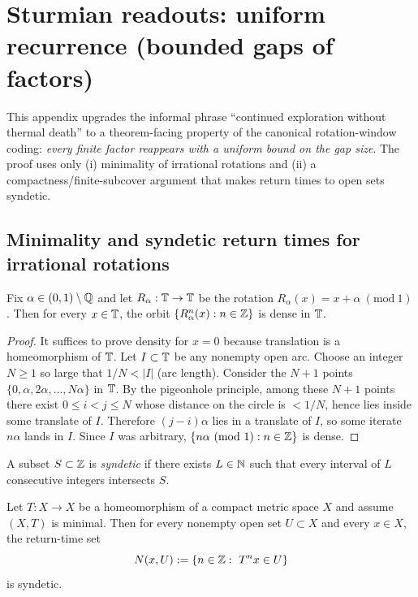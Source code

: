 \section{Sturmian readouts: uniform recurrence (bounded gaps of factors)}
\label{app:sturmian_uniform_recurrence}
\noindent
This appendix upgrades the informal phrase ``continued exploration without thermal death'' to a theorem-facing property of the canonical rotation-window coding:
\emph{every finite factor reappears with a uniform bound on the gap size}.
The proof uses only (i) minimality of irrational rotations and (ii) a compactness/finite-subcover argument that makes return times to open sets syndetic.

\subsection{Minimality and syndetic return times for irrational rotations}
\label{subsec:sturmian_syndetic_rotation}

\begin{lemma}\label{lem:irrational_rotation_minimal}
\MathTag Fix $\alpha\in(0,1)\setminus\mathbb{Q}$ and let $R_\alpha:\mathbb{T}\to\mathbb{T}$ be the rotation $R_\alpha(x)=x+\alpha\ (\mathrm{mod}\ 1)$.
Then for every $x\in\mathbb{T}$, the orbit $\{R_\alpha^n(x):n\in\mathbb{Z}\}$ is dense in $\mathbb{T}$.
\end{lemma}

\begin{proof}
It suffices to prove density for $x=0$ because translation is a homeomorphism of $\mathbb{T}$.
Let $I\subset\mathbb{T}$ be any nonempty open arc. Choose an integer $N\ge 1$ so large that $1/N<|I|$ (arc length).
Consider the $N+1$ points $\{0,\alpha,2\alpha,\ldots,N\alpha\}$ in $\mathbb{T}$.
By the pigeonhole principle, among these $N+1$ points there exist $0\le i<j\le N$ whose distance on the circle is $<1/N$, hence lies inside some translate of $I$.
Therefore $(j-i)\alpha$ lies in a translate of $I$, so some iterate $n\alpha$ lands in $I$.
Since $I$ was arbitrary, $\{n\alpha\ (\mathrm{mod}\ 1):n\in\ZZ\}$ is dense.
\end{proof}

\begin{definition}\label{def:syndetic_subset}
\MathTag A subset $S\subset\mathbb{Z}$ is \emph{syndetic} if there exists $L\in\mathbb{N}$ such that every interval of $L$ consecutive integers intersects $S$.
\end{definition}

\begin{lemma}\label{lem:return_times_syndetic}
\MathTag Let $T:X\to X$ be a homeomorphism of a compact metric space $X$ and assume $(X,T)$ is minimal.
Then for every nonempty open set $U\subset X$ and every $x\in X$, the return-time set
\[
N(x,U):=\{n\in\mathbb{Z}:\ T^n x\in U\}
\]
is syndetic.
\end{lemma}


